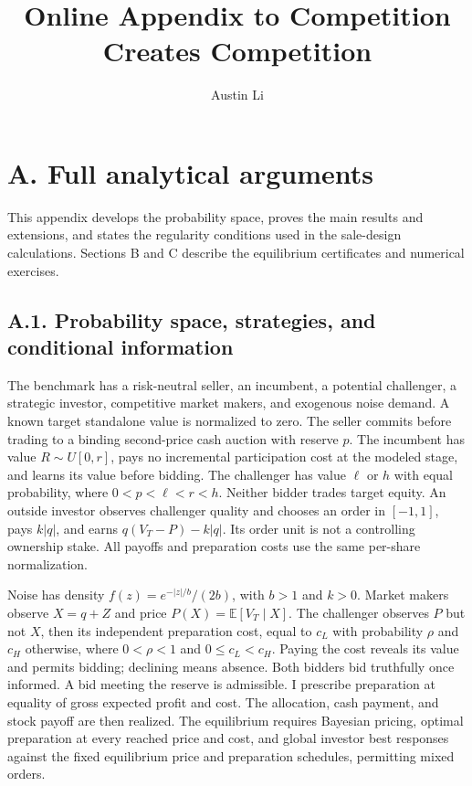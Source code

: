 \documentclass[
  11pt,
]{article}
\title{Online Appendix to Competition Creates Competition}
\author{Austin Li}
\date{}
\begin{document}
\maketitle

\section{A. Full analytical arguments}\label{oa-a}

This appendix develops the probability space, proves the main results
and extensions, and states the regularity conditions used in the
sale-design calculations. Sections B and C describe the equilibrium
certificates and numerical exercises.

\subsection{A.1. Probability space, strategies, and conditional
information}\label{oa-a-foundations}

The benchmark has a risk-neutral seller, an incumbent, a potential
challenger, a strategic investor, competitive market makers, and
exogenous noise demand. A known target standalone value is normalized to
zero. The seller commits before trading to a binding second-price cash
auction with reserve \(p\). The incumbent has value \(R\sim U[0,r]\),
pays no incremental participation cost at the modeled stage, and learns
its value before bidding. The challenger has value \(\ell\) or \(h\)
with equal probability, where \(0<p<\ell<r<h\). Neither bidder trades
target equity. An outside investor observes challenger quality and
chooses an order in \([-1,1]\), pays \(k|q|\), and earns
\(q(V_T-P)-k|q|\). Its order unit is not a controlling ownership stake.
All payoffs and preparation costs use the same per-share normalization.

Noise has density \(f(z)=e^{-|z|/b}/(2b)\), with \(b>1\) and \(k>0\).
Market makers observe \(X=q+Z\) and price \(P(X)=\mathbb E[V_T\mid X]\).
The challenger observes \(P\) but not \(X\), then its independent
preparation cost, equal to \(c_L\) with probability \(\rho\) and \(c_H\)
otherwise, where \(0<\rho<1\) and \(0\le c_L<c_H\). Paying the cost
reveals its value and permits bidding; declining means absence. Both
bidders bid truthfully once informed. A bid meeting the reserve is
admissible. I prescribe preparation at equality of gross expected profit
and cost. The allocation, cash payment, and stock payoff are then
realized. The equilibrium requires Bayesian pricing, optimal preparation
at every reached price and cost, and global investor best responses
against the fixed equilibrium price and preparation schedules,
permitting mixed orders.
\end{document}
